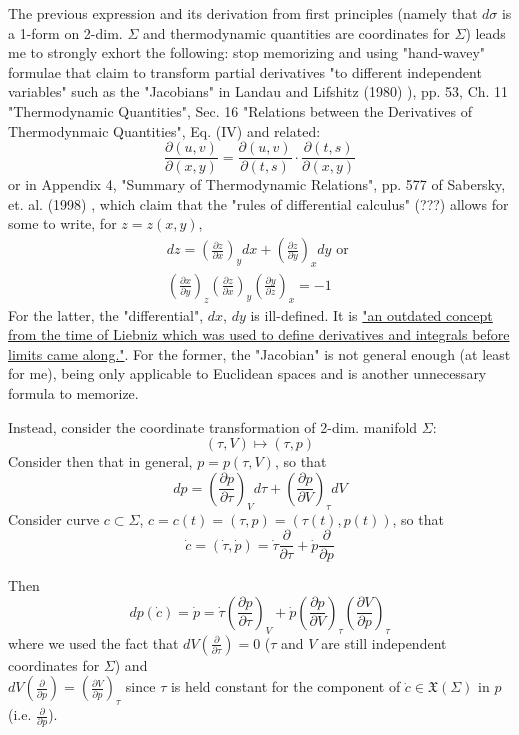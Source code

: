 The previous expression and its derivation from first principles (namely that $d\sigma$ is a 1-form on 2-dim. $\Sigma$ and thermodynamic quantities are coordinates for $\Sigma$) leads me to strongly exhort the following: stop memorizing and using "hand-wavey" formulae that claim to transform partial derivatives "to different independent variables" such as the "Jacobians" in Landau and Lifshitz (1980) \cite{LLandauELifshitz1980}), pp. 53, Ch. 11 "Thermodynamic Quantities", Sec. 16 "Relations between the Derivatives of Thermodynmaic Quantities", Eq. (IV) and related:
\[
\frac{ \partial (u,v)}{ \partial (x,y)} = \frac{ \partial (u,v) }{ \partial (t,s)} \cdot \frac{\partial (t,s) }{ \partial (x,y) }
\]
or in Appendix 4, "Summary of Thermodynamic Relations", pp. 577 of Sabersky, et. al. (1998) \cite{SAHG1998}, which claim that the "rules of differential calculus" (???) allows for some to write, for $z = z(x,y)$, 
\[
\begin{gathered} 
dz = \left( \frac{ \partial z}{ \partial x} \right)_y dx + \left( \frac{ \partial z}{ \partial y} \right)_x dy \text{ or } \\
\left( \frac{ \partial x }{ \partial y} \right)_z \left( \frac{ \partial z }{ \partial x} \right)_y \left( \frac{ \partial y}{ \partial z }\right)_x = -1
\end{gathered}
\]
For the latter, the "differential", $dx$, $dy$ is ill-defined. It is \href{https://math.stackexchange.com/questions/2101896/what-is-the-meaning-of-a-differential-in-terms-of-an-exact-differential}{"an outdated concept from the time of Liebniz which was used to define derivatives and integrals before limits came along."}. For the former, the "Jacobian" is not general enough (at least for me), being only applicable to Euclidean spaces and is another unnecessary formula to memorize.

Instead, consider the coordinate transformation of 2-dim. manifold $\Sigma$:
\[
(\tau, V) \mapsto (\tau, p)
\]
Consider then that in general, $p = p(\tau, V)$, so that 
\[
dp = \left( \frac{ \partial p }{ \partial \tau} \right)_V d\tau + \left( \frac{ \partial p }{ \partial V} \right)_{\tau} dV
\]
Consider curve $c\subset \Sigma$, $c=c(t) = (\tau, p) = (\tau(t), p(t))$, so that 
\[
\dot{c} = ( \dot{\tau}, \dot{p}) = \dot{\tau} \frac{ \partial }{ \partial \tau } + \dot{p} \frac{ \partial }{ \partial p}
\]

Then
\begin{equation}\label{Eq:CoordinateTransformationOfPressurep}
dp(\dot{c}) = \dot{p} = \dot{\tau} \left( \frac{ \partial p }{ \partial \tau} \right)_V + \dot{p} \left( \frac{\partial p}{ \partial V}\right)_{\tau}  \left( \frac{ \partial V}{ \partial p } \right)_{\tau}
\end{equation}
where we used the fact that $dV \left( \frac{ \partial }{ \partial \tau } \right) = 0 $ ($\tau$ and $V$ are still independent coordinates for $\Sigma$) and \\
$dV\left( \frac{ \partial }{ \partial p} \right) = \left( \frac{ \partial V}{ \partial p } \right)_{\tau}$ since $\tau$ is held constant for the component of $\dot{c} \in \mathfrak{X}(\Sigma)$ in $p$ (i.e. $\frac{\partial }{ \partial p}$).

